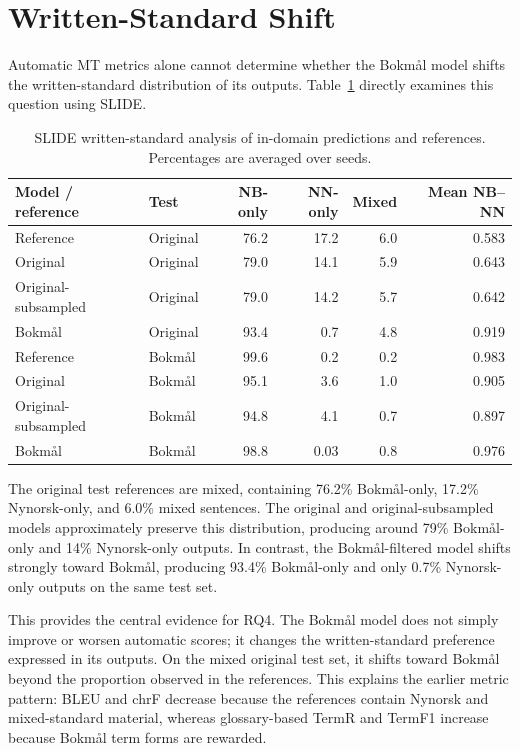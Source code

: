 \documentclass[11pt]{article}
\newcommand{\nb}{Bokm{\aa}l}
\newcommand{\nn}{Nynorsk}
\begin{document}
\section{Written-Standard Shift}

Automatic MT metrics alone cannot determine whether the \nb{} model shifts the written-standard distribution of its outputs. Table~\ref{tab:slide} directly examines this question using SLIDE.

\begin{table}[t]
\centering
\small
\begin{tabular}{llrrrr}
\toprule
Model / reference & Test & NB-only & NN-only & Mixed & Mean NB--NN \\
\midrule
Reference & Original & 76.2 & 17.2 & 6.0 & 0.583 \\
Original & Original & 79.0 & 14.1 & 5.9 & 0.643 \\
Original-subsampled & Original & 79.0 & 14.2 & 5.7 & 0.642 \\
\nb{} & Original & 93.4 & 0.7 & 4.8 & 0.919 \\
\midrule
Reference & \nb{} & 99.6 & 0.2 & 0.2 & 0.983 \\
Original & \nb{} & 95.1 & 3.6 & 1.0 & 0.905 \\
Original-subsampled & \nb{} & 94.8 & 4.1 & 0.7 & 0.897 \\
\nb{} & \nb{} & 98.8 & 0.03 & 0.8 & 0.976 \\
\bottomrule
\end{tabular}
\caption{SLIDE written-standard analysis of in-domain predictions and references. Percentages are averaged over seeds.}
\label{tab:slide}
\end{table}

The original test references are mixed, containing 76.2\% \nb{}-only, 17.2\% \nn{}-only, and 6.0\% mixed sentences. The original and original-subsampled models approximately preserve this distribution, producing around 79\% \nb{}-only and 14\% \nn{}-only outputs. In contrast, the \nb{}-filtered model shifts strongly toward \nb{}, producing 93.4\% \nb{}-only and only 0.7\% \nn{}-only outputs on the same test set.

This provides the central evidence for RQ4. The \nb{} model does not simply improve or worsen automatic scores; it changes the written-standard preference expressed in its outputs. On the mixed original test set, it shifts toward \nb{} beyond the proportion observed in the references. This explains the earlier metric pattern: BLEU and chrF decrease because the references contain \nn{} and mixed-standard material, whereas glossary-based TermR and TermF1 increase because \nb{} term forms are rewarded.
\end{document}
